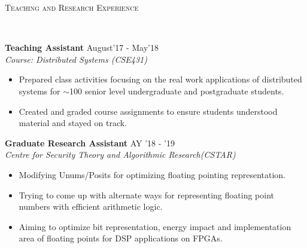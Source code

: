 \documentclass[10pt]{article}
\newenvironment{changemargin}[2]{%
    \begin{list}{}{%
            \setlength{\topsep}{0pt}%
            \setlength{\leftmargin}{#1}%
            \setlength{\rightmargin}{#2}%
            \setlength{\listparindent}{\parindent}%
        \setlength{\itemindent}{\parindent}%
            \setlength{\parsep}{\parskip}%
        }%
\item[]}{\end{list}
}
\newcommand{\lineover}{
    \begin{changemargin}{-0.05in}{-0.10in}
        \vspace*{-8pt}
        \hrulefill \\
        \vspace*{-2pt}
    \end{changemargin}
}
\newcommand{\header}[1]{
    \begin{changemargin}{-0.75in}{-0.75in}
        \scshape{#1}\\
        \lineover
    \end{changemargin}
}
\newenvironment{body} {
    \vspace*{-16pt}
    \begin{changemargin}{-0.6in}{-0.65in}
    }   
    {\end{changemargin}
}
\begin{document}
\header{Teaching and Research Experience}
\vspace{14pt}
\begin{body}
    \textbf{Teaching Assistant} \hfill{August'17 - May'18}
    \\ \emph{Course: Distributed Systems (CSE431)}
    \begin{itemize}
        \item Prepared class activities focusing on the real work applications of distributed systems for $\sim$100 senior level undergraduate and postgraduate students.
        \item Created and graded course assignments to ensure students understood material and stayed on track.
    \end{itemize}
\end{body}
\vspace{14pt}
\begin{body}
    \textbf{Graduate Research Assistant} \hfill{AY '18 - '19}
    \\ \emph{Centre for Security Theory and Algorithmic Research(CSTAR)}
        \begin{itemize}
          \item{Modifying Unums/Posits for optimizing floating pointing representation.}
          \item{Trying to come up with alternate ways for representing floating point numbers with efficient arithmetic logic.}
          \item{Aiming to optimize bit representation, energy impact and implementation area of floating points for DSP applications on FPGAs.}
        \end{itemize}
\end{body}
\smallskip
\end{document}
